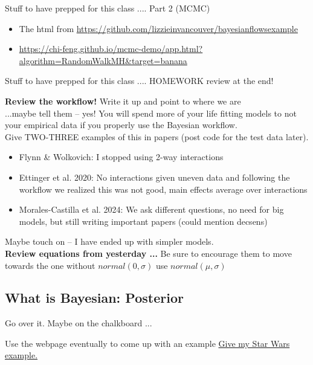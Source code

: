 \documentclass[11pt]{article}
\begin{document}
Stuff to have prepped for this class .... Part 2 (MCMC) 
\begin{itemize}
\item The html from \url{https://github.com/lizzieinvancouver/bayesianflowsexample}
\item \url{https://chi-feng.github.io/mcmc-demo/app.html?algorithm=RandomWalkMH&target=banana}
\end{itemize}

Stuff to have prepped for this class .... HOMEWORK review at the end!

{\bf Review the workflow!} Write it up  and point to where we are \\
...maybe tell them -- yes! 
You will spend more of your life fitting models to not your empirical data if you properly use the Bayesian workflow.\\
Give TWO-THREE examples of this in papers (post code for the test data later). \\ %
\begin{itemize}
\item Flynn \& Wolkovich: I stopped using 2-way interactions
\item Ettinger et al. 2020: No interactions given uneven data and following the workflow we realized this was not good, main effects average over interactions
\item Morales-Castilla et al. 2024: We ask different questions, no need for big models, but still writing important papers (could mention decsens)
\end{itemize}
Maybe touch on -- I have ended up with simpler models. \\

{\bf Review equations from yesterday ...}
Be sure to encourage them to move towards the one without $normal(0, \sigma)$  use $normal(\mu, \sigma)$

\subsection{What is Bayesian: Posterior}
Go over it. Maybe on the chalkboard ...  

Use the webpage eventually to come up with an example
\href{https://www.countbayesie.com/blog/2015/2/18/hans-solo-and-bayesian-priors}{Give my Star Wars example.}

\end{document}
